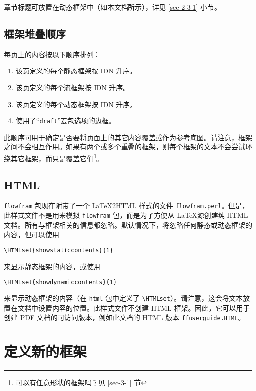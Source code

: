 \documentclass[a4paper]{book}%
\newcommand{\sty}[1]{\texttt{#1}}
\newcommand{\filename}[1]{\texttt{#1}}
\newcommand{\cmd}[1]{\texttt{#1}}
\begin{document}
章节标题可放置在动态框架中（如本文档所示），详见 \ref{sec-2-3-1} 小节。
\section{框架堆叠顺序}%
每页上的内容按以下顺序排列：
\begin{enumerate}
    \item 该页定义的每个静态框架按 IDN 升序。
    \item 该页定义的每个流框架按 IDN 升序。
    \item 该页定义的每个动态框架按 IDN 升序。
    \item 使用了“\cmd{draft}”宏包选项的边框。
\end{enumerate}

此顺序可用于确定是否要将页面上的其它内容覆盖或作为参考底图。请注意，框架之间不会相互作用。如果有两个或多个重叠的框架，则每个框架的文本不会尝试环绕其它框架，而只是覆盖它们\footnote{可以有任意形状的框架吗？见 \ref{sec-3-1} 节}。
\section{HTML}%
\sty{flowfram} 包现在附带了一个 \LaTeX{}2HTML 样式的文件 \filename{flowfram.perl}。但是，此样式文件不是用来模拟 \sty{flowfram} 包，而是为了方便从 \LaTeX 源创建纯 HTML 文档。所有与框架相关的信息都忽略。默认情况下，将忽略任何静态或动态框架的内容，但可以使用
\begin{mdframed}[backgroundcolor=white]
\verb|\HTMLset{showstaticcontents}{1}|
\end{mdframed}
来显示静态框架的内容，或使用
\begin{mdframed}[backgroundcolor=white]
\verb|\HTMLset{showdynamiccontents}{1}|
\end{mdframed}
来显示动态框架的内容（在 \sty{html} 包中定义了 \verb|\HTMLset|）。请注意，这会将文本放置在文档中设置内容的位置。此样式文件不创建 HTML 框架。因此，它可以用于创建 PDF 文档的可访问版本，例如此文档的 HTML 版本 \filename{ffuserguide.HTML}。

\chapter{定义新的框架}%
\end{document}
